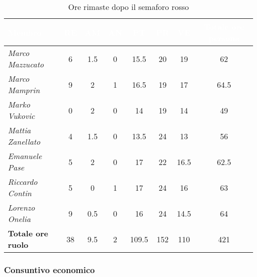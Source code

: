 \begin{table}[H]
    \renewcommand\arraystretch{1.5}
    \centering
    \begin{tabular}{|l|c|c|c|c|c|c|c|}
    \hline
    \rowcolor[HTML]{036400}
    \textcolor{white}{\textbf{Membro}} & \multicolumn{1}{c|}{\textcolor{white}{\textbf{RE}}} & \multicolumn{1}{c|}{\textcolor{white}{\textbf{AM}}} & \multicolumn{1}{c|}{\textcolor{white}{\textbf{AN}}} & \multicolumn{1}{c|}{\textcolor{white}{\textbf{PT}}} & \multicolumn{1}{c|}{\textcolor{white}{\textbf{PR}}} & \multicolumn{1}{c|}{\textcolor{white}{\textbf{VE}}} & \multicolumn{1}{c|}{\textcolor{white}{\textbf{Totale ore persona}}} \\ \hline
    \rowcolor[HTML]{EFEFEF}\textit{Marco Mazzucato}  & 6  & 1.5  & 0     & 15.5  & 20  & 19     & 62     \\ \hline
    \rowcolor[HTML]{C0C0C0}\textit{Marco Mamprin}    & 9  & 2    & 1     & 16.5  & 19  & 17     & 64.5     \\ \hline
    \rowcolor[HTML]{EFEFEF}\textit{Marko Vukovic}    & 0  & 2    & 0     & 14    & 19  & 14     & 49     \\ \hline
    \rowcolor[HTML]{C0C0C0}\textit{Mattia Zanellato} & 4  & 1.5  & 0     & 13.5  & 24  & 13     & 56     \\ \hline
    \rowcolor[HTML]{EFEFEF}\textit{Emanuele Pase}    & 5  & 2    & 0     & 17    & 22  & 16.5   & 62.5     \\ \hline
    \rowcolor[HTML]{C0C0C0}\textit{Riccardo Contin}  & 5  & 0    & 1     & 17    & 24  & 16     & 63     \\ \hline
    \rowcolor[HTML]{EFEFEF}\textit{Lorenzo Onelia}   & 9  & 0.5  & 0     & 16    & 24  & 14.5   & 64     \\ \hline
    \rowcolor[HTML]{C0C0C0}\textbf{Totale ore ruolo} & 38 & 9.5  & 2     & 109.5 & 152 & 110    & 421    \\ \hline
    \end{tabular}
    \caption{Ore rimaste dopo il semaforo rosso}
\end{table}

\subsubsection{Consuntivo economico}

